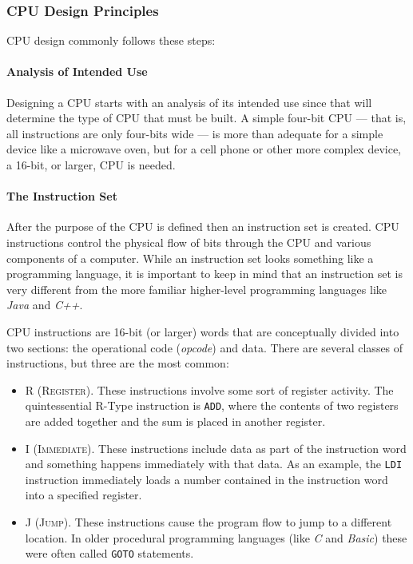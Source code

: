 \subsubsection{CPU Design Principles}

\ac{CPU} design commonly follows these steps:

\paragraph{Analysis of Intended Use} Designing a \ac{CPU} starts with an analysis of its intended use since that will determine the type of \ac{CPU} that must be built. A simple four-bit \ac{CPU} --- that is, all instructions are only four-bits wide --- is more than adequate for a simple device like a microwave oven, but for a cell phone or other more complex device, a 16-bit, or larger, \ac{CPU} is needed. 

\paragraph{The Instruction Set} After the purpose of the \ac{CPU} is defined then an instruction set is created. \ac{CPU} instructions control the physical flow of bits through the \ac{CPU} and various components of a computer. While an instruction set looks something like a programming language, it is important to keep in mind that an instruction set is very different from the more familiar higher-level programming languages like \emph{Java} and \emph{C++}.

\ac{CPU} instructions are 16-bit (or larger) words that are conceptually divided into two sections: the operational code (\emph{opcode}) and data. There are several classes of instructions, but three are the most common: 

\begin{itemize}
  \item \textsc{R (Register)}. These instructions involve some sort of register activity. The quintessential R-Type instruction is \lstinline[columns=fixed]|ADD|, where the contents of two registers are added together and the sum is placed in another register.
  \item \textsc{I (Immediate)}. These instructions include data as part of the instruction word and something happens immediately with that data. As an example, the \lstinline[columns=fixed]|LDI| instruction immediately loads a number contained in the instruction word into a specified register.
  \item \textsc{J (Jump)}. These instructions cause the program flow to jump to a different location. In older procedural programming languages (like \emph{C} and \emph{Basic}) these were often called \lstinline[columns=fixed]|GOTO| statements.
\end{itemize}


